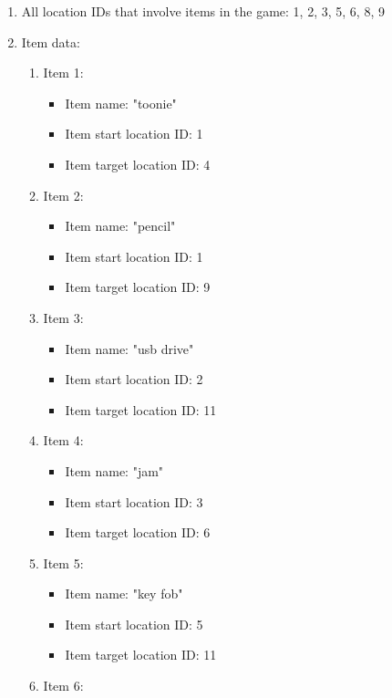 \documentclass[11pt]{article}
\begin{document}
\begin{enumerate}
    \item All location IDs that involve items in the game: 1, 2, 3, 5, 6, 8, 9
    \item Item data:
    \begin{enumerate}
        \item Item 1:
        \begin{itemize}
            \item Item name: "toonie"
            \item Item start location ID: 1
            \item Item target location ID: 4
        \end{itemize}
        \item Item 2:
        \begin{itemize}
            \item Item name: "pencil"
            \item Item start location ID: 1
            \item Item target location ID: 9
        \end{itemize}
        \item Item 3:
        \begin{itemize}
            \item Item name: "usb drive"
            \item Item start location ID: 2
            \item Item target location ID: 11
        \end{itemize}
        \item Item 4:
        \begin{itemize}
            \item Item name: "jam"
            \item Item start location ID: 3
            \item Item target location ID: 6
        \end{itemize}
        \item Item 5:
        \begin{itemize}
            \item Item name: "key fob"
            \item Item start location ID: 5
            \item Item target location ID: 11
        \end{itemize}
        \item Item 6:
        \begin{itemize}

\end{itemize}
\end{enumerate}
\end{enumerate}
\end{document}
